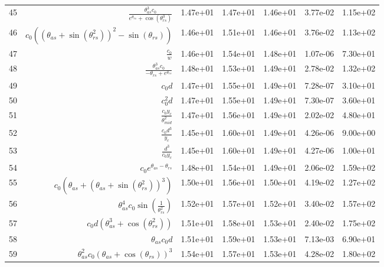 \begin{tabularx}{\textwidth}{lRRRRRl}
45  &  $ \displaystyle\frac{\theta_{as}^{3} c_{0}}{e^{\theta_{rs}} + \cos{\left(\theta_{rs}^{3} \right)}} $  &  1.47e+01  &  1.47e+01  &  1.46e+01  &  3.77e-02  &  1.15e+02  \\ 
46  &  $ c_{0} \left(\left(\theta_{as} + \sin{\left(\theta_{rs}^{2} \right)}\right)^{2} - \sin{\left(\theta_{rs} \right)}\right) $  &  1.46e+01  &  1.51e+01  &  1.46e+01  &  3.76e-02  &  1.13e+02  \\ 
47  &  $ \displaystyle\frac{c_{0}}{w} $  &  1.46e+01  &  1.54e+01  &  1.48e+01  &  1.07e-06  &  7.30e+01  \\ 
48  &  $ \displaystyle\frac{\theta_{as}^{3} c_{0}}{- \theta_{rs} + e^{\theta_{rs}}} $  &  1.48e+01  &  1.53e+01  &  1.49e+01  &  2.78e-02  &  1.32e+02  \\ 
49  &  $ c_{0} d $  &  1.47e+01  &  1.55e+01  &  1.49e+01  &  7.28e-07  &  3.10e+01  \\ 
50  &  $ c_{0}^{2} d $  &  1.47e+01  &  1.55e+01  &  1.49e+01  &  7.30e-07  &  3.60e+01  \\ 
51  &  $ \displaystyle\frac{c_{0} y_c}{\theta_{mid}^{2}} $  &  1.47e+01  &  1.56e+01  &  1.49e+01  &  2.02e-02  &  4.80e+01  \\ 
52  &  $ \displaystyle\frac{c_{0} d^{3}}{y_c} $  &  1.45e+01  &  1.60e+01  &  1.49e+01  &  4.26e-06  &  9.00e+00  \\ 
53  &  $ \displaystyle\frac{d^{3}}{c_{0} y_c} $  &  1.45e+01  &  1.60e+01  &  1.49e+01  &  4.27e-06  &  1.00e+01  \\ 
54  &  $ c_{0} e^{\theta_{as} - \theta_{rs}} $  &  1.48e+01  &  1.54e+01  &  1.49e+01  &  2.06e-02  &  1.59e+02  \\ 
55  &  $ c_{0} \left(\theta_{as} + \left(\theta_{as} + \sin{\left(\theta_{rs}^{2} \right)}\right)^{3}\right) $  &  1.50e+01  &  1.56e+01  &  1.50e+01  &  4.19e-02  &  1.27e+02  \\ 
56  &  $ \theta_{as}^{4} c_{0} \sin{\left(\displaystyle\frac{1}{\theta_{rs}^{2}} \right)} $  &  1.52e+01  &  1.57e+01  &  1.52e+01  &  3.40e-02  &  1.57e+02  \\ 
57  &  $ c_{0} d \left(\theta_{as}^{3} + \cos{\left(\theta_{rs}^{2} \right)}\right) $  &  1.51e+01  &  1.58e+01  &  1.53e+01  &  2.40e-02  &  1.75e+02  \\ 
58  &  $ \theta_{as} c_{0} d $  &  1.51e+01  &  1.59e+01  &  1.53e+01  &  7.13e-03  &  6.90e+01  \\ 
59  &  $ \theta_{as}^{2} c_{0} \left(\theta_{as} + \cos{\left(\theta_{rs} \right)}\right)^{3} $  &  1.54e+01  &  1.57e+01  &  1.53e+01  &  4.28e-02  &  1.80e+02  \\ 

\end{tabularx}
